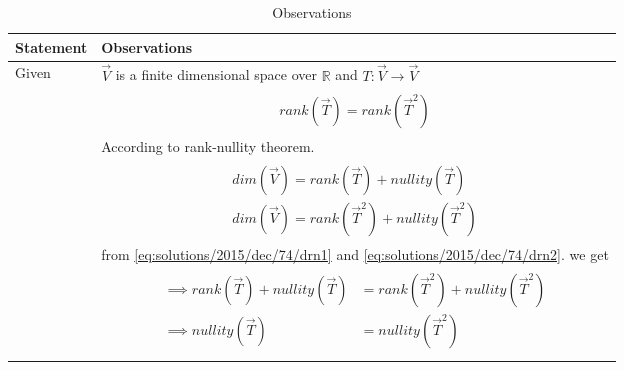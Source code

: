 \begin{longtable}{|l|l|}
\hline
\endhead
\textbf{Statement}&\textbf{Observations}\\
\hline
Given&$\vec{V}$ is a finite dimensional space over $\mathbb{R}$ and $T:\vec{V}\rightarrow\vec{V}$\\&\parbox{15cm}{\begin{align}
    rank(\vec{T})=rank(\vec{T}^2)\label{eq:solutions/2015/dec/74/r}
\end{align}}\\&According to rank-nullity theorem.\\&\parbox{15cm}{\begin{align}
    dim(\vec{V})=rank(\vec{T})+nullity(\vec{T})\label{eq:solutions/2015/dec/74/drn1}\\
    dim(\vec{V})=rank(\vec{T}^2)+nullity(\vec{T}^2)\label{eq:solutions/2015/dec/74/drn2}
\end{align}}\\&from \eqref{eq:solutions/2015/dec/74/drn1} and \eqref{eq:solutions/2015/dec/74/drn2}. we get\\&\parbox{15cm}{\begin{align}
    \implies rank(\vec{T})+nullity(\vec{T})&=rank(\vec{T}^2)+nullity(\vec{T}^2)\\
    \implies nullity(\vec{T})&=nullity(\vec{T}^2)\label{eq:solutions/2015/dec/74/n}
\end{align}}\\
\hline
\caption{Observations}
\label{eq:solutions/2015/dec/74/obs}
\end{longtable}
